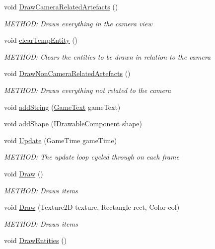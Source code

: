 \begin{DoxyCompactItemize}
void \hyperlink{a00458_aee587a69646dc58e02ba4430f1368bf0}{Draw\+Camera\+Related\+Artefacts} ()
\begin{DoxyCompactList}\small\item\em M\+E\+T\+H\+OD\+: Draws everything in the camera view \end{DoxyCompactList}\item 
void \hyperlink{a00458_a7879b28e310859cdebdc2c8aeaced6b3}{clear\+Temp\+Entity} ()
\begin{DoxyCompactList}\small\item\em M\+E\+T\+H\+OD\+: Clears the entities to be drawn in relation to the camera \end{DoxyCompactList}\item 
void \hyperlink{a00458_a566b23b9d0b60e2fb06107e7a6c239cb}{Draw\+Non\+Camera\+Related\+Artefacts} ()
\begin{DoxyCompactList}\small\item\em M\+E\+T\+H\+OD\+: Draws everything not related to the camera \end{DoxyCompactList}\item 
void \hyperlink{a00458_ae3d8ed9fc1406b62e04ac8336e4e40b3}{add\+String} (\hyperlink{a00598}{Game\+Text} game\+Text)
\item 
void \hyperlink{a00458_a89bf09f0f2d6144e68cd045d39f13374}{add\+Shape} (\hyperlink{a00454}{I\+Drawable\+Component} shape)
\item 
void \hyperlink{a00458_a99572d9e2280e1d7c21c002255ffe201}{Update} (Game\+Time game\+Time)
\begin{DoxyCompactList}\small\item\em M\+E\+T\+H\+OD\+: The update loop cycled through on each frame \end{DoxyCompactList}\item 
void \hyperlink{a00458_afac9eb0644db9971494332e7d179bbf9}{Draw} ()
\begin{DoxyCompactList}\small\item\em M\+E\+T\+H\+OD\+: Draws items \end{DoxyCompactList}\item 
void \hyperlink{a00458_ad9f875208c0f901d3e90facfea2acfc0}{Draw} (Texture2D texture, Rectangle rect, Color col)
\begin{DoxyCompactList}\small\item\em M\+E\+T\+H\+OD\+: Draws items \end{DoxyCompactList}\item 
void \hyperlink{a00458_aa7c35d67893f29738baab63370d16b10}{Draw\+Entities} ()

\end{DoxyCompactItemize}
